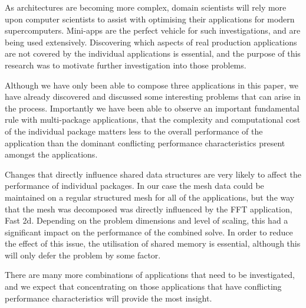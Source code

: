 \documentclass[runningheads,a4paper]{llncs}
\begin{document}
As architectures are becoming more complex, domain scientists will rely more upon computer scientists to assist with optimising their applications for modern supercomputers. Mini-apps are the perfect vehicle for such investigations, and are being used extensively. Discovering which aspects of real production applications are not covered by the individual applications is essential, and the purpose of this research was to motivate further investigation into those problems.

Although we have only been able to compose three applications in this paper, we have already discovered and discussed some interesting problems that can arise in the process. Importantly we have been able to observe an important fundamental rule with multi-package applications, that the complexity and computational cost of the individual package matters less to the overall performance of the application than the dominant conflicting performance characteristics present amongst the applications.

Changes that directly influence shared data structures are very likely to affect the performance of individual packages. In our case the mesh data could be maintained on a regular structured mesh for all of the applications, but the way that the mesh was decomposed was directly influenced by the FFT application, Fast 2d. Depending on the problem dimensions and level of scaling, this had a significant impact on the performance of the combined solve. In order to reduce the effect of this issue, the utilisation of shared memory is essential, although this will only defer the problem by some factor.

There are many more combinations of applications that need to be investigated, and we expect that concentrating on those applications that have conflicting performance characteristics will provide the most insight.



\end{document}
